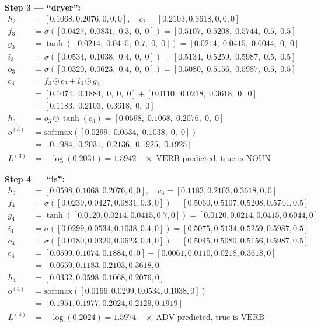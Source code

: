 \textbf{Step 3 --- ``dryer'':}
\begin{align*}
    h_2 &= [0.1068,0.2076,0,0,0], \quad c_2 = [0.2103,0.3618,0,0,0] \\[4pt]
    f_3 &= \sigma([0.0427,\;0.0831,\;0.3,\;0,\;0])
         = [0.5107,\;0.5208,\;0.5744,\;0.5,\;0.5] \\
    g_3 &= \tanh([0.0214,\;0.0415,\;0.7,\;0,\;0])
         = [0.0214,\;0.0415,\;0.6044,\;0,\;0] \\
    i_3 &= \sigma([0.0534,\;0.1038,\;0.4,\;0,\;0])
         = [0.5134,\;0.5259,\;0.5987,\;0.5,\;0.5] \\
    o_3 &= \sigma([0.0320,\;0.0623,\;0.4,\;0,\;0])
         = [0.5080,\;0.5156,\;0.5987,\;0.5,\;0.5] \\[4pt]
    c_3 &= f_3 \odot c_2 + i_3 \odot g_3 \\
        &= [0.1074,\;0.1884,\;0,\;0,\;0] + [0.0110,\;0.0218,\;0.3618,\;0,\;0] \\
        &= [0.1183,\;0.2103,\;0.3618,\;0,\;0] \\[4pt]
    h_3 &= o_3 \odot \tanh(c_3) = [0.0598,\;0.1068,\;0.2076,\;0,\;0] \\[4pt]
    o^{(3)} &= \text{softmax}([0.0299,\;0.0534,\;0.1038,\;0,\;0]) \\
             &= [0.1984,\;0.2031,\;0.2136,\;0.1925,\;0.1925] \\
    L^{(3)} &= -\log(0.2031) = 1.5942 \quad \times \text{ VERB predicted, true is NOUN}
\end{align*}

\textbf{Step 4 --- ``is'':}
\begin{align*}
    h_3 &= [0.0598,0.1068,0.2076,0,0], \quad c_3 = [0.1183,0.2103,0.3618,0,0] \\[4pt]
    f_4 &= \sigma([0.0239,0.0427,0.0831,0.3,0])
         = [0.5060,0.5107,0.5208,0.5744,0.5] \\
    g_4 &= \tanh([0.0120,0.0214,0.0415,0.7,0])
         = [0.0120,0.0214,0.0415,0.6044,0] \\
    i_4 &= \sigma([0.0299,0.0534,0.1038,0.4,0])
         = [0.5075,0.5134,0.5259,0.5987,0.5] \\
    o_4 &= \sigma([0.0180,0.0320,0.0623,0.4,0])
         = [0.5045,0.5080,0.5156,0.5987,0.5] \\[4pt]
    c_4 &= [0.0599,0.1074,0.1884,0,0] + [0.0061,0.0110,0.0218,0.3618,0] \\
        &= [0.0659,0.1183,0.2103,0.3618,0] \\[4pt]
    h_4 &= [0.0332,0.0598,0.1068,0.2076,0] \\[4pt]
    o^{(4)} &= \text{softmax}([0.0166,0.0299,0.0534,0.1038,0]) \\
             &= [0.1951,0.1977,0.2024,0.2129,0.1919] \\
    L^{(4)} &= -\log(0.2024) = 1.5974 \quad \times \text{ ADV predicted, true is VERB}
\end{align*}

